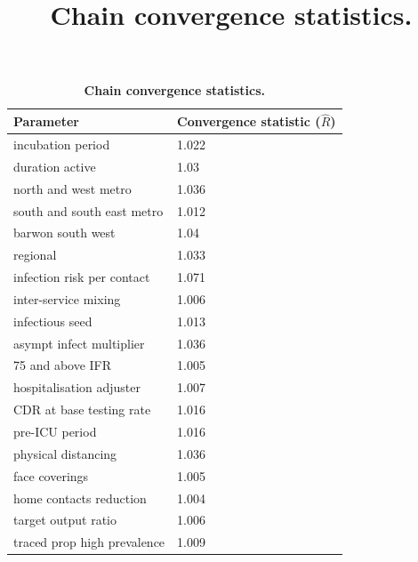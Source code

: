 \begin{table}[ht]
\renewcommand{\baselinestretch}{1}
	\begin{tabular}[ht]{| p{7cm} | p{6cm} |}
	\hline
		\textbf{Parameter} & \textbf{Convergence statistic} (\(\hat{R}\)) \\
		
\hline incubation period & 1.022 \\

\hline duration active & 1.03 \\

\hline north and west metro & 1.036 \\

\hline south and south east metro & 1.012 \\

\hline barwon south west & 1.04 \\

\hline regional & 1.033 \\

\hline infection risk per contact & 1.071 \\

\hline inter-service mixing & 1.006 \\

\hline infectious seed & 1.013 \\

\hline asympt infect multiplier & 1.036 \\

\hline 75 and above IFR & 1.005 \\

\hline hospitalisation adjuster & 1.007 \\

\hline CDR at base testing rate & 1.016 \\

\hline pre-ICU period & 1.016 \\

\hline physical distancing & 1.036 \\

\hline face coverings & 1.005 \\

\hline home contacts reduction & 1.004 \\

\hline target output ratio & 1.006 \\

\hline traced prop high prevalence & 1.009 \\

	\hline
    \end{tabular}
    \title{Chain convergence statistics.}
    \caption{\textbf{Chain convergence statistics.}}	
    \label{tab:convergence}
\end{table}



